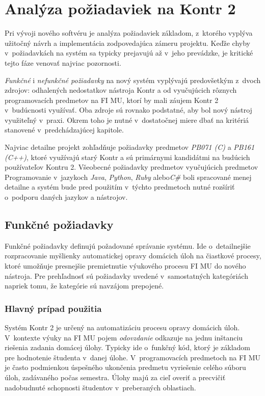 \documentclass[
  digital, %
  oneside, %
  table,   %
  lof,     %
  lot,   %
]{fithesis3}
\begin{document}
\chapter{Analýza požiadaviek na Kontr 2}

Pri vývoji nového softvéru je analýza požiadaviek základom, z~ktorého vyplýva užitočný návrh a implementácia zodpovedajúca zámeru projektu. Keďže chyby v~požiadavkách na systém sa typicky prejavujú až v~jeho prevádzke, je kritické tejto fáze venovať najviac pozornosti. 

\emph{Funkčné} i \emph{nefunkčné požiadavky} na nový systém vyplývajú predovšetkým z~dvoch zdrojov: odhalených nedostatkov nástroja Kontr a od vyučujúcich rôznych programovacích predmetov na FI MU, ktorí by mali záujem Kontr 2 v~budúcnosti využívať. Oba zdroje sú rovnako podstatné, aby bol nový nástroj využiteľný v~praxi. Okrem toho je nutné v~dostatočnej miere dbať na kritériá stanovené v~predchádzajúcej kapitole.

Najviac detailne projekt zohľadňuje požiadavky predmetov \emph{PB071 (C)} a \emph{PB161 (C++)}, ktoré využívajú starý Kontr a sú primárnymi kandidátmi na budúcich používateľov Kontru 2. Všeobecné požiadavky predmetov vyučujúcich predmetov Programovanie v~jazykoch \emph{Java}, \emph{Python}, \emph{Ruby} alebo\emph{C\#} boli spracované menej detailne a systém bude pred použitím v~týchto predmetoch nutné rozšíriť o~podporu daných jazykov a nástrojov. 

\section{Funkčné požiadavky}

Funkčné požiadavky definujú požadované správanie systému. Ide o~detailnejšie rozpracovanie myšlienky automatickej opravy domácich úloh na čiastkové procesy, ktoré umožňuje presnejšie premietnutie výukového procesu FI MU do nového nástroja. Pre prehľadnosť sú požiadavky uvedené v~samostatných kategóriách napriek tomu, že kategórie sú navzájom prepojené.

\subsection{Hlavný prípad použitia}

Systém Kontr 2 je určený na automatizáciu procesu opravy domácich úloh. V~kontexte výuky na FI MU pojem \textit{odovzdanie} odkazuje na jednu inštanciu riešenia zadania domácej úlohy. Typicky ide o~funkčný kód, ktorý je základom pre hodnotenie študenta v~danej úlohe. V~programovacích predmetoch na FI MU je často podmienkou úspešného ukončenia predmetu vyriešenie celého súboru úloh, zadávaného počas semestra. Úlohy majú za cieľ overiť a precvičiť nadobudnuté schopnosti študentov v~preberaných oblastiach. 
\end{document}
